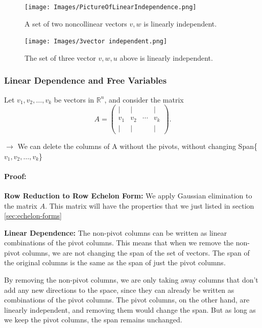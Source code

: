 \documentclass[a4paper,12pt]{article}
\begin{document}
\begin{figure}
    \centering
    \texttt{[image: Images/PictureOfLinearIndependence.png]}
    \caption{A set of two noncollinear vectors {\(v, w\)} is linearly independent.}
    \label{fig:enter-label}
\end{figure}

\begin{figure}
    \centering
    \texttt{[image: Images/3vector independent.png]}
    \caption{The set of three vector {\(v, w, u\)} above is linearly independent.}
    \label{fig:enter-label}
\end{figure}

\subsubsection{Linear Dependence and Free Variables} 

\begin{tcolorbox}[title=Theorem,colframe=blue!70!black, colback=blue!5!white]
Let {\(v_1, v_2,\dots,v_k\)} be vectors in \(\mathbb{R}^n\), and consider the matrix 
\[
A =
\begin{pmatrix}
\vert & \vert & & \vert \\
v_1 & v_2 & \cdots & v_k \\
\vert & \vert & & \vert
\end{pmatrix}.
\]

$\rightarrow$ We can delete the columns of A without the pivots, without changing Span\{$v_1, v_2,\dots,v_k$\}\\
\end{tcolorbox}


\paragraph{Proof:\\}
\textbf{Row Reduction to Row Echelon Form:} We apply Gaussian elimination to the matrix \(A\). This matrix will have the properties that we just listed in section \ref{sec:echelon-forms}

\textbf{Linear Dependence:} The non-pivot columns can be written as linear combinations of the pivot columns. This means that when we remove the non-pivot columns, we are not changing the span of the set of vectors. The span of the original columns is the same as the span of just the pivot columns.

By removing the non-pivot columns, we are only taking away columns that don’t add any new directions to the space, since they can already be written as combinations of the pivot columns. The pivot columns, on the other hand, are linearly independent, and removing them would change the span. But as long as we keep the pivot columns, the span remains unchanged.
\end{document}
